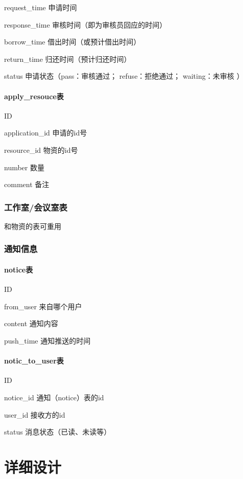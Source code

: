 \documentclass[a4paper,fancyhdr,fntef,hyperref]{ctexart}
\begin{document}
request\_time 申请时间

response\_time 审核时间（即为审核员回应的时间）

borrow\_time 借出时间（或预计借出时间）

return\_time 归还时间（预计归还时间）

status 申请状态（pass：审核通过； refuse：拒绝通过； waiting：未审核 ）

\paragraph{apply\_resouce表}\label{applyux5fresouceux8868}

ID

application\_id 申请的id号

resource\_id 物资的id号

number 数量

comment 备注

\subsubsection{工作室/会议室表}\label{ux5de5ux4f5cux5ba4ux4f1aux8baeux5ba4ux8868}

和物资的表可重用

\subsubsection{通知信息}\label{ux901aux77e5ux4fe1ux606f}

\paragraph{notice表}\label{noticeux8868}

ID

from\_user 来自哪个用户

content 通知内容

push\_time 通知推送的时间

\paragraph{notic\_to\_user表}\label{noticux5ftoux5fuserux8868}

ID

notice\_id 通知（notice）表的id

user\_id 接收方的id

status 消息状态（已读、未读等）

\section{详细设计}\label{ux8be6ux7ec6ux8bbeux8ba1}
\end{document}
